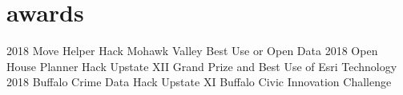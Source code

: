 \documentclass[]{twentysecondcv}
\begin{document}
\section{awards}

  \begin{twenty}
    \twentyitem
      {2018}
      {Move Helper} %
      {Hack Mohawk Valley} %
      {Best Use or Open Data} %
    \twentyitem
      {2018}
      {Open House Planner} %
      {Hack Upstate XII} %
      {Grand Prize and Best Use of Esri Technology} %
    \twentyitem
      {2018}
      {Buffalo Crime Data} %
      {Hack Upstate XI} %
      {Buffalo Civic Innovation Challenge} %

  \end{twenty}









\end{document}
